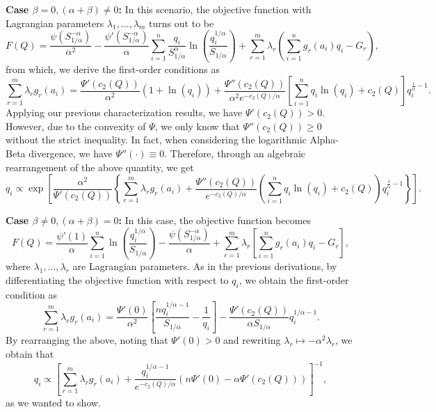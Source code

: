 \documentclass[11pt]{article}
\theoremstyle{plain}
\theoremstyle{remark}
\begin{document}
\noindent\textbf{Case $\beta = 0, (\alpha+\beta)\neq 0$:} In this scenario, the objective function with Lagrangian parameters $\lambda_1, \dots, \lambda_m$ turns out to be
\begin{equation*}
    F(Q) = \dfrac{\psi\left( S_{1/\alpha}^{-\alpha} \right)}{\alpha^2} - \dfrac{\psi'\left( S_{1/\alpha}^{-\alpha} \right)}{\alpha} \sum_{i=1}^n \dfrac{q_i}{S_{1/\alpha}^\alpha}\ln\left( \dfrac{q_i^{1/\alpha}}{S_{1/\alpha}} \right) + \sum_{r=1}^m \lambda_r \left( \sum_{i=1}^n g_r(a_i)q_i - G_r \right),
\end{equation*}
\noindent from which, we derive the first-order conditions as
\begin{equation*}
    \sum_{r=1}^m \lambda_r g_r(a_i)
    =  \dfrac{\Psi'(c_2(Q))}{\alpha^2}(1+\ln(q_i)) + \dfrac{\Psi''(c_2(Q))}{\alpha^2 e^{-c_2(Q)/\alpha}} \left[ \sum_{i=1}^n q_i\ln(q_i) + c_2(Q) \right]q_i^{\frac{1}{\alpha}-1}.
\end{equation*}
\noindent Applying our previous characterization results, we have $\Psi'(c_2(Q)) > 0$. However, due to the convexity of $\Psi$, we only know that $\Psi''(c_2(Q)) \geq 0$ without the strict inequality. In fact, when considering the logarithmic Alpha-Beta divergence, we have $\Psi''(\cdot) \equiv 0$. Therefore, through an algebraic rearrangement of the above quantity, we get
\begin{equation*}
    q_i \propto \exp\left[ \dfrac{\alpha^2}{\Psi'(c_2(Q))} \left\{ \sum_{r=1}^m \lambda_r g_r(a_i) + \frac{\Psi''(c_2(Q))}{e^{-c_2(Q)/\alpha}} \left( \sum_{i=1}^n q_i\ln(q_i) + c_2(Q) \right) q_i^{\frac{1}{\alpha}-1} \right\} \right].
\end{equation*}

\noindent\textbf{Case $\beta \neq 0, (\alpha+\beta) = 0$:} In this case, the objective function becomes
\begin{equation*}
    F(Q) = \dfrac{\psi'(1)}{\alpha}\sum_{i=1}^n \ln\left( \dfrac{q_i^{1/\alpha}}{S_{1/\alpha}} \right) - \dfrac{\psi\left( S_{1/\alpha}^{-\alpha} \right)}{\alpha} + \sum_{r=1}^m \lambda_r \left[ \sum_{i=1}^n g_r(a_i)q_i - G_r \right],
\end{equation*}
\noindent where $\lambda_1, \dots, \lambda_r$ are Lagrangian parameters. As in the previous derivations, by differentiating the objective function with respect to $q_i$, we obtain the first-order condition as
\begin{equation*}
    \sum_{r=1}^m \lambda_r g_r(a_i)
    = \dfrac{\Psi'(0)}{\alpha^2} \left[ \dfrac{nq_i^{1/\alpha-1}}{S_{1/\alpha}} - \dfrac{1}{q_i} \right] - \dfrac{\Psi'(c_2(Q))}{\alpha S_{1/\alpha}}q_i^{1/\alpha-1}.
\end{equation*}
\noindent By rearranging the above, noting that $\Psi'(0) > 0$ and rewriting $\lambda_r \mapsto -\alpha^2\lambda_r$, we obtain that
\begin{equation*}
    q_i \propto \left[ \sum_{r=1}^m \lambda_r g_r(a_i) + \dfrac{q_i^{1/\alpha-1}}{e^{-c_2(Q)/\alpha}} \left( n\Psi'(0) - \alpha\Psi'(c_2(Q)) \right) \right]^{-1},
\end{equation*}
\noindent as we wanted to show.
\end{document}
